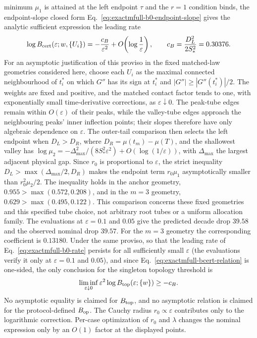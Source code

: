 \begin{remark}
minimum \(\mu_1\) is attained at the left endpoint \(\tau\) and the \(r=1\)
condition binds, the endpoint-slope closed form
Eq.~\eqref{eq:exactmfull-b0-endpoint-slope} gives the analytic sufficient
expression the leading rate
\begin{equation}
 \log B_{\rm cert}(\varepsilon;w,\{U_i\})
 =-\frac{c_B}{\varepsilon^2}
  +O\!\left(\log\frac1\varepsilon\right),
 \qquad
 c_B=\frac{D_L^2}{2S_*^2}=0.30376.
 \label{eq:exactmfull-b0-rate}
\end{equation}
For an asymptotic justification of this proviso in the fixed matched-law
geometries considered here, choose each \(U_i\) as the maximal connected
neighbourhood of \(t_i^*\) on which \(G''\) has its sign at \(t_i^*\) and
\(|G''|\ge|G''(t_i^*)|/2\).  The weights are fixed and positive, and the
matched contact factor tends to one, with exponentially small
time-derivative corrections, as \(\varepsilon\downarrow0\).  The peak-tube
edges remain within \(O(\varepsilon)\) of their peaks, while the
valley-tube edges approach the neighbouring peaks' inner inflection points;
their slopes therefore have only algebraic dependence on \(\varepsilon\).
The outer-tail comparison then selects the left endpoint when \(D_L>D_R\),
where \(D_R=\mu(t_m)-\mu(T)\), and the shallowest valley has
\(\log\mu_2=-\Delta_{\max}^2/(8S_*^2\varepsilon^2)+O(\log(1/\varepsilon))\),
with \(\Delta_{\max}\) the largest adjacent physical gap.  Since \(r_0\)
is proportional to \(\varepsilon\), the strict inequality
\(D_L>\max(\Delta_{\max}/2,D_R)\) makes the endpoint term \(r_0\mu_1\)
asymptotically smaller than \(r_0^2\mu_2/2\).  The inequality holds in the
anchor geometry, \(0.955>\max(0.572,0.208)\), and in the \(m=3\) geometry,
\(0.629>\max(0.495,0.122)\).  This comparison concerns these fixed
geometries and this specified tube choice, not arbitrary root tubes or a
uniform allocation family.
The evaluations at \(\varepsilon=0.1\) and \(0.05\) give the predicted
decade drop \(39.58\) and the observed nominal drop \(39.57\).  For the
\(m=3\) geometry the corresponding coefficient is \(0.13180\).  Under the
same proviso, so that the leading rate of Eq.~\eqref{eq:exactmfull-b0-rate}
persists for all sufficiently small \(\varepsilon\) (the evaluations verify
it only at \(\varepsilon=0.1\) and \(0.05\)), and since
Eq.~\eqref{eq:exactmfull-bcert-relation} is one-sided, the only conclusion
for the singleton topology threshold is
\begin{equation*}
 \liminf_{\varepsilon\downarrow0}
 \varepsilon^2\log B_{\rm top}(\varepsilon;\{w\})\ge-c_B.
\end{equation*}
No asymptotic equality is claimed for \(B_{\rm top}\), and no asymptotic
relation is claimed for the protocol-defined \(B_{\rm op}\).  The Cauchy
radius \(r_0\propto\varepsilon\) contributes only to the logarithmic
correction.  Per-case optimization of \(r_0\) and \(\lambda\) changes the
nominal expression only by an \(O(1)\) factor at the displayed points.


\end{remark}
